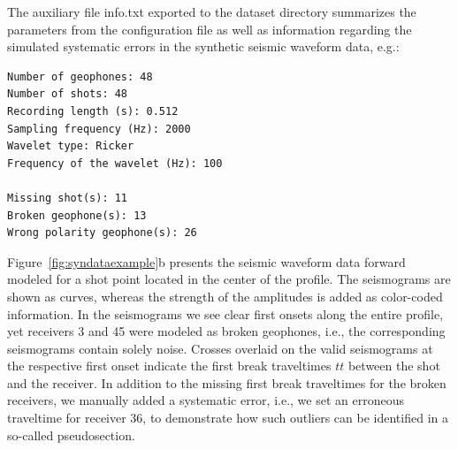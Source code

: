\documentclass[a4paper,fleqn]{cas-sc}
\begin{document}
The auxiliary file info.txt exported to the dataset directory summarizes the parameters from the configuration file as well as information regarding the simulated systematic errors in the synthetic seismic waveform data, e.g.:
\begin{footnotesize}
\begin{verbatim}
Number of geophones: 48
Number of shots: 48
Recording length (s): 0.512
Sampling frequency (Hz): 2000
Wavelet type: Ricker
Frequency of the wavelet (Hz): 100

Missing shot(s): 11
Broken geophone(s): 13
Wrong polarity geophone(s): 26
\end{verbatim}
\end{footnotesize}

Figure~\ref{fig:syndataexample}b presents the seismic waveform data forward modeled for a shot point located in the center of the profile. The seismograms are shown as curves, whereas the strength of the amplitudes is added as color-coded information. In the seismograms we see clear first onsets along the entire profile, yet receivers 3 and 45 were modeled as broken geophones, i.e., the corresponding seismograms contain solely noise. Crosses overlaid on the valid seismograms at the respective first onset indicate the first break traveltimes $tt$ between the shot and the receiver. In addition to the missing first break traveltimes for the broken receivers, we manually added a systematic error, i.e., we set an erroneous traveltime for receiver 36, to demonstrate how such outliers can be identified in a so-called pseudosection.
\end{document}
